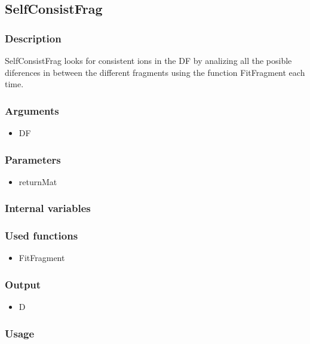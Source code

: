\subsection{SelfConsistFrag}\label{SelfConsistFrag}
\subsubsection{Description}
SelfConsistFrag looks for consistent ions in the DF by analizing all the posible diferences in between the different fragments using the function FitFragment each time.
\subsubsection{Arguments}
\begin{itemize}
\item DF
\end{itemize}
\subsubsection{Parameters}
\begin{itemize}
\item returnMat
\end{itemize}
\subsubsection{Internal variables}
\subsubsection{Used functions}
\begin{itemize}
\item FitFragment
\end{itemize}
\subsubsection{Output}
\begin{itemize}
\item D %
\end{itemize}
\subsubsection{Usage}


